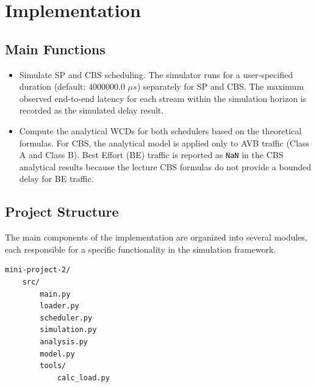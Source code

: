 \section{Implementation}
\subsection{Main Functions}

\begin{itemize}
\item Simulate SP and CBS scheduling. The simulator runs for a user-specified duration (default: 4000000.0 $\mu s$) separately for SP and CBS. The maximum observed end-to-end latency for each stream within the simulation horizon is recorded as the simulated delay result.

\item Compute the analytical WCDs for both schedulers based on the theoretical formulas. For CBS, the analytical model is applied only to AVB traffic (Class A and Class B). Best Effort (BE) traffic is reported as \texttt{NaN} in the CBS analytical results because the lecture CBS formulas do not provide a bounded delay for BE traffic.
\end{itemize}

\subsection{Project Structure}

The main components of the implementation are organized into several modules, each responsible for a specific functionality in the simulation framework.
\begin{verbatim}
mini-project-2/
    src/
        main.py
        loader.py
        scheduler.py
        simulation.py
        analysis.py
        model.py
        tools/
            calc_load.py
\end{verbatim}

